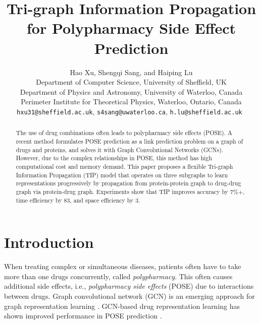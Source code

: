 \documentclass{article}
\title{Tri-graph Information Propagation for Polypharmacy Side Effect Prediction}
\author{Hao Xu, Shengqi Sang, and Haiping Lu  \\
  Department of Computer Science, University of Sheffield, UK\\
  Department of Physics and Astronomy, University of Waterloo, Canada\\
  Perimeter Institute for Theoretical Physics, Waterloo, Ontario, Canada\\
  \texttt{hxu31@sheffield.ac.uk}, \texttt{s4sang@uwaterloo.ca}, \texttt{h.lu@sheffield.ac.uk } }
\begin{document}
\maketitle

\begin{abstract}
The use of drug combinations often leads to polypharmacy side effects (POSE). A recent method formulates POSE prediction as a link prediction problem on a graph of drugs and proteins, and solves it with Graph Convolutional Networks (GCNs). However, due to the complex relationships in POSE, this method has high computational cost and memory demand. This paper proposes a flexible Tri-graph Information Propagation (TIP) model that operates on three subgraphs to learn representations progressively by propagation from protein-protein graph to drug-drug graph via protein-drug graph. Experiments show that TIP improves accuracy by 7\%+, time efficiency by 83, and space efficiency by 3. 

\end{abstract}



\section{Introduction}
\label{intro}






When treating complex or simultaneous diseases, patients often have to take more than one drugs concurrently, called \emph{polypharmacy}. This often causes additional side effects, i.e., \emph{polypharmacy side effects} (POSE) due to interactions between drugs. Graph convolutional network (GCN) is an emerging approach for graph representation learning \cite{repre, gae, gcn}. GCN-based drug representation learning has shown improved performance in POSE prediction \cite{multiview, kgc, deepddi, gamenet, decagon}. 
\end{document}

